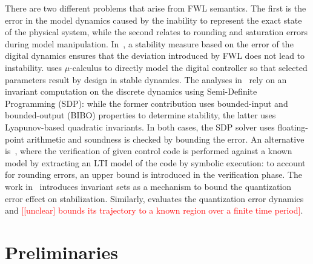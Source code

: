 \documentclass[twocolumn]{autart}    %
\renewcommand{\note}[1]{\textcolor{red}{[#1]}}
\begin{document}
There are two different problems that arise from FWL semantics.  The first
is the error in the model dynamics caused by the inability to represent the exact
state of the physical system, while the second relates to rounding and
saturation errors during model manipulation.  
In~\cite{fialho1994stability}, a stability measure based on the error of the digital dynamics ensures that
the deviation introduced by FWL does not lead to instability.  
\cite{DBLP:journals/automatica/WuLCC09} uses $\mu$-calculus to directly model the digital controller so that selected
parameters result by design in stable dynamics.  
The analyses in~\cite{DBLP:conf/hybrid/RouxJG15, DBLP:conf/hybrid/WangGRJF16} rely on an
invariant computation on the discrete dynamics using Semi-Definite
Programming (SDP):  while the former contribution uses bounded-input and bounded-output
(BIBO) properties to determine stability, the latter uses Lyapunov-based
quadratic invariants.  In both cases, the SDP solver uses floating-point
arithmetic and soundness is checked by bounding the error.  
An alternative is~\cite{park2016scalable}, where the verification of given control code is
performed against a known model by extracting an LTI model of the code by
symbolic execution: to account for rounding errors, an upper bound is
introduced in the verification phase.  
The work in~\cite{picasso2003stabilization} introduces invariant sets as a mechanism to
bound the quantization error effect on stabilization.  
Similarly, 
\cite{liberzon2003hybrid} evaluates the quantization error dynamics and \note{[unclear] bounds its trajectory to a known region over a finite time period}.   


\section{Preliminaries}
\label{sec:model}

\end{document}
